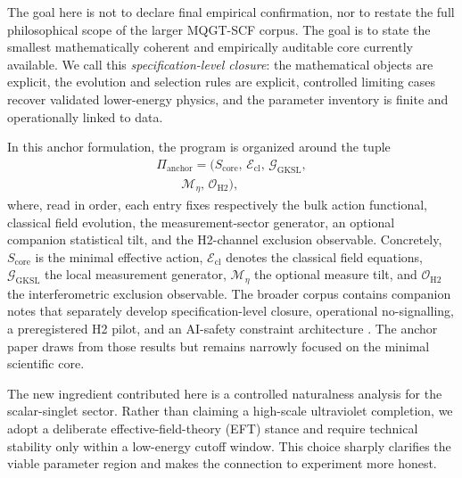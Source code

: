 \documentclass[aps,prd,twocolumn,superscriptaddress,nofootinbib]{revtex4-2}
\begin{document}
The goal here is not to declare final empirical confirmation, nor to restate the full philosophical scope of the larger MQGT-SCF corpus. The goal is to state the smallest mathematically coherent and empirically auditable core currently available. We call this \emph{specification-level closure}: the mathematical objects are explicit, the evolution and selection rules are explicit, controlled limiting cases recover validated lower-energy physics, and the parameter inventory is finite and operationally linked to data.

In this anchor formulation, the program is organized around the tuple
\begin{equation}
\begin{split}
\Pi_{\mathrm{anchor}} = \bigl(S_{\mathrm{core}},\, \mathcal{E}_{\mathrm{cl}},\, \mathcal{G}_{\mathrm{GKSL}}, \\
\qquad{} \mathcal{M}_{\eta},\, \mathcal{O}_{\mathrm{H2}}\bigr),
\end{split}
\end{equation}
where, read in order, each entry fixes respectively the bulk action functional, classical field evolution, the measurement-sector generator, an optional companion statistical tilt, and the H2-channel exclusion observable.
Concretely, $S_{\mathrm{core}}$ is the minimal effective action, $\mathcal{E}_{\mathrm{cl}}$ denotes the classical field equations, $\mathcal{G}_{\mathrm{GKSL}}$ the local measurement generator, $\mathcal{M}_{\eta}$ the optional measure tilt, and $\mathcal{O}_{\mathrm{H2}}$ the interferometric exclusion observable. The broader corpus contains companion notes that separately develop specification-level closure, operational \mbox{no-signalling}, a preregistered H2 pilot, and an AI-safety constraint architecture \cite{BairdClosure2026,BairdNoSignal2026,BairdH22026,BairdABIL2026}. The anchor paper draws from those results but remains narrowly focused on the minimal scientific core.

The new ingredient contributed here is a controlled naturalness analysis for the scalar-singlet sector. Rather than claiming a high-scale ultraviolet completion, we adopt a deliberate effective-field-theory (EFT) stance and require technical stability only within a low-energy cutoff window. This choice sharply clarifies the viable parameter region and makes the connection to experiment more honest.
\end{document}
